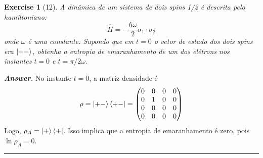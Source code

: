 \documentclass[12pt]{article}
\def\be{\begin{equation}}
\def\ee{\end{equation}}
\def\f{\frac}
\newtheorem{exercise}{Exercise}
\newenvironment{answer}{\noindent\textbf{\textit{Answer.}} \normalfont }{\par\noindent\rule{\textwidth}{0.4pt}}
\begin{document}
	\begin{exercise}[12]
		A dinâmica de um sistema de dois spins 1/2 é descrita pelo hamiltoniano:
		\be
			\hat{H} = -\f{\hbar\omega}{2}\sigma_1\cdot\sigma_2
		\ee
		onde $\omega$ é uma constante. Supondo que em $t = 0$ o vetor de estado dos dois spins era $\ket{+-}$, obtenha a entropia de emaranhamento de um dos elétrons nos instantes $t = 0$ e $t = \pi/2\omega$.
	\end{exercise}
	\begin{answer}
		No instante $t=0$, a matriz densidade é
		\be
			\rho = \ket{+-}\bra{+-} = 
			\begin{pmatrix}
				0 & 0 & 0 & 0 \\
				0 & 1 & 0 & 0 \\
				0 & 0 & 0 & 0 \\
				0 & 0 & 0 & 0 \\
			\end{pmatrix}
		\ee
		Logo, $\rho_A = \ket{+}\bra{+}$. Isso implica que a entropia de emaranhamento é zero, pois $\ln\rho_A = 0$. 
		
	\end{answer}
\end{document}
